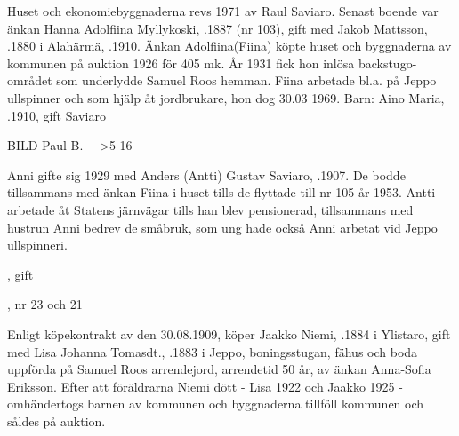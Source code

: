 
Huset och ekonomiebyggnaderna revs 1971 av Raul Saviaro. Senast boende var änkan Hanna Adolfiina Myllykoski, .1887 (nr 103), gift med Jakob Mattsson, .1880 i Alahärmä, .1910. Änkan Adolfiina(Fiina) köpte huset och byggnaderna av kommunen på auktion 1926 för 405 mk. År 1931 fick hon inlösa backstugo-området som underlydde Samuel Roos hemman. Fiina arbetade bl.a. på Jeppo ullspinner och som hjälp åt jordbrukare, hon dog 30.03 1969.  Barn:  Aino Maria, .1910, gift Saviaro


BILD Paul B. --->5-16

Anni gifte sig 1929 med Anders (Antti) Gustav Saviaro, .1907. De bodde tillsammans med änkan Fiina i huset tills de flyttade till nr 105 år 1953. Antti arbetade åt Statens järnvägar tills han blev pensionerad, tillsammans med hustrun Anni bedrev de småbruk, som ung hade också Anni  arbetat vid Jeppo ullspinneri.
\begin{jhchildren}
  \item {}, gift
  \item {}, nr 23 och 21
\end{jhchildren}


Enligt köpekontrakt av den 30.08.1909, köper Jaakko Niemi, .1884 i Ylistaro, gift med Lisa Johanna Tomasdt., .1883 i Jeppo, boningsstugan, fähus och boda uppförda på Samuel Roos arrendejord, arrendetid 50 år, av änkan Anna-Sofia Eriksson. Efter att föräldrarna Niemi dött - Lisa 1922 och Jaakko 1925 - omhändertogs barnen av kommunen och byggnaderna tillföll kommunen och såldes på auktion.
\begin{jhchildren}
  \item {}
  \item {}
  \item {}
  \item {}
  \item {}
\end{jhchildren}


